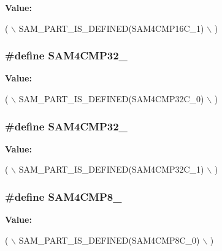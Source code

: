 {\bfseries Value\-:}
\begin{DoxyCode}
( \(\backslash\)
                SAM\_PART\_IS\_DEFINED(SAM4CMP16C\_1) \(\backslash\)
                )
\end{DoxyCode}
\hypertarget{group__sam__part__macros__group_gaf581d4fe9779afce853dfe577bdeb67b}{
\subsubsection[{S\-A\-M4\-C\-M\-P32\-\_\-0}]{\setlength{\rightskip}{0pt plus 5cm}\#define S\-A\-M4\-C\-M\-P32\-\_}}\label{group__sam__part__macros__group_gaf581d4fe9779afce853dfe577bdeb67b}
{\bfseries Value\-:}
\begin{DoxyCode}
( \(\backslash\)
                SAM\_PART\_IS\_DEFINED(SAM4CMP32C\_0) \(\backslash\)
                )
\end{DoxyCode}
\hypertarget{group__sam__part__macros__group_gadcf0406c9868af4d67e4eeaca0b641ac}{
\subsubsection[{S\-A\-M4\-C\-M\-P32\-\_\-1}]{\setlength{\rightskip}{0pt plus 5cm}\#define S\-A\-M4\-C\-M\-P32\-\_}}\label{group__sam__part__macros__group_gadcf0406c9868af4d67e4eeaca0b641ac}
{\bfseries Value\-:}
\begin{DoxyCode}
( \(\backslash\)
                SAM\_PART\_IS\_DEFINED(SAM4CMP32C\_1) \(\backslash\)
                )
\end{DoxyCode}
\hypertarget{group__sam__part__macros__group_gadaadeb2fb79d513f13503d300ab9c95d}{
\subsubsection[{S\-A\-M4\-C\-M\-P8\-\_\-0}]{\setlength{\rightskip}{0pt plus 5cm}\#define S\-A\-M4\-C\-M\-P8\-\_}}\label{group__sam__part__macros__group_gadaadeb2fb79d513f13503d300ab9c95d}
{\bfseries Value\-:}
\begin{DoxyCode}
( \(\backslash\)
                SAM\_PART\_IS\_DEFINED(SAM4CMP8C\_0) \(\backslash\)
                )
\end{DoxyCode}
